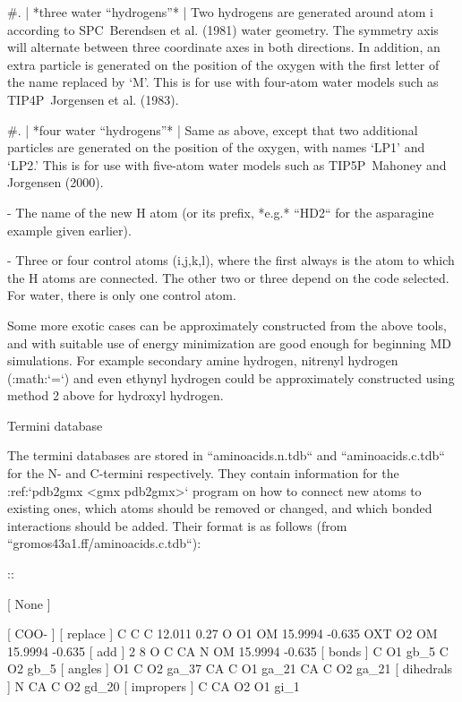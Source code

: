    #. | *three water “hydrogens”*
      | Two hydrogens are generated around atom i according to
        SPC Berendsen et al. (1981) water geometry. The symmetry axis
        will alternate between three coordinate axes in both directions.
        In addition, an extra particle is generated on the position of
        the oxygen with the first letter of the name replaced by ‘M’.
        This is for use with four-atom water models such as
        TIP4P Jorgensen et al. (1983).

   #. | *four water “hydrogens”*
      | Same as above, except that two additional particles are
        generated on the position of the oxygen, with names ‘LP1’ and
        ‘LP2.’ This is for use with five-atom water models such as
        TIP5P Mahoney and Jorgensen (2000).

-  The name of the new H atom (or its prefix, *e.g.* ``HD2``
   for the asparagine example given earlier).

-  Three or four control atoms (i,j,k,l), where the first always is the
   atom to which the H atoms are connected. The other two or three
   depend on the code selected. For water, there is only one control
   atom.

Some more exotic cases can be approximately constructed from the above
tools, and with suitable use of energy minimization are good enough for
beginning MD simulations. For example secondary amine hydrogen, nitrenyl
hydrogen (:math:`=`)
and even ethynyl hydrogen could be approximately constructed using
method 2 above for hydroxyl hydrogen.

Termini database
~~~~~~~~~~~~~~~~

The termini
databases
are stored in ``aminoacids.n.tdb`` and
``aminoacids.c.tdb`` for the N- and C-termini respectively.
They contain information for the :ref:`pdb2gmx <gmx pdb2gmx>` program on how
to connect new atoms to existing ones, which atoms should be removed or
changed, and which bonded interactions should be added. Their format is
as follows (from ``gromos43a1.ff/aminoacids.c.tdb``):

::

    [ None ]

    [ COO- ]
    [ replace ]
    C	C	C	12.011	0.27
    O 	O1	OM	15.9994	-0.635
    OXT	O2	OM	15.9994	-0.635
    [ add ]
    2	8	O	C	CA	N
    	OM	15.9994	-0.635
    [ bonds ]
    C	O1	gb_5
    C	O2	gb_5
    [ angles ]
    O1	C	O2	ga_37
    CA	C	O1	ga_21
    CA	C	O2	ga_21
    [ dihedrals ]
    N	CA	C	O2	gd_20
    [ impropers ]
    C	CA	O2	O1	gi_1


